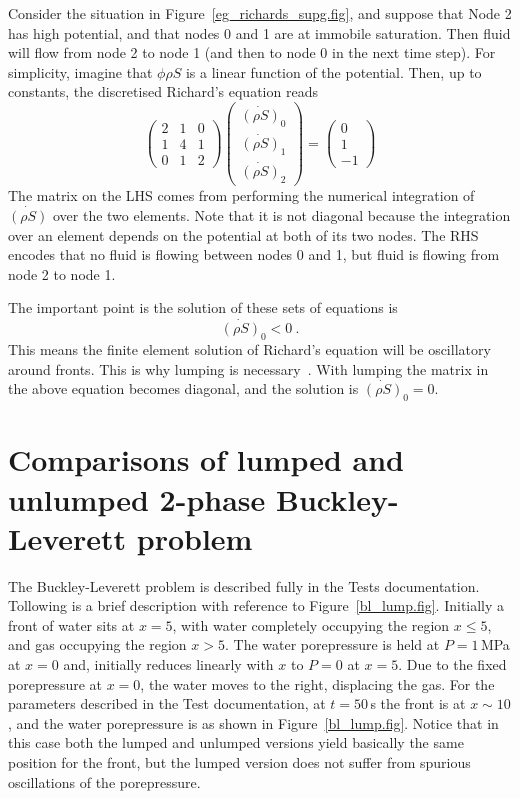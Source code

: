 \documentclass[]{scrreprt}
\begin{document}
Consider the situation in Figure~\ref{eg_richards_supg.fig}, and
suppose that Node 2 has high potential, and that nodes 0 and 1 are at
immobile saturation.  Then fluid will flow from node 2 to node 1 (and
then to node 0 in the next time step).  For simplicity, imagine that
$\phi\rho S$ is a linear
function of the potential.  Then, up to constants, the
discretised Richard's equation reads
\begin{equation}
\left(
\begin{array}{ccc}
2 & 1 & 0 \\
1 & 4 & 1 \\
0 & 1 & 2
\end{array}
\right)
\left(
\begin{array}{c}
\dot{(\rho S)}_{0} \\
\dot{(\rho S)}_{1} \\
\dot{(\rho S)}_{2}
\end{array}
\right)
=
\left(
\begin{array}{c}
0 \\
1 \\
-1
\end{array}
\right)
\end{equation}
The matrix on the LHS comes from performing the numerical integration
of $\dot{(\rho S)}$ over the two elements.  Note that it is not diagonal
because the integration over an element depends on the potential at
both of its two nodes.  The RHS encodes that no fluid is flowing
between nodes 0 and 1, but fluid is flowing from node 2 to node 1.

The important point is the solution of these sets of equations is
\begin{equation}
\dot{(\rho S)}_{0} < 0 \ .
\end{equation}
This means the finite element solution of Richard's equation will be
oscillatory around fronts.  This is why lumping is
necessary~\cite{celiaET1990}.  With lumping the matrix in the above
equation becomes diagonal, and the solution is $\dot{(\rho S)}_{0} =
0$.

\section{Comparisons of lumped and unlumped 2-phase Buckley-Leverett problem}

The Buckley-Leverett problem is described fully in the Tests
documentation.  Tollowing is a brief description with reference to
Figure~\ref{bl_lump.fig}.  Initially a front of water sits at $x=5$,
with water completely occupying the region $x\leq 5$, and gas
occupying the region $x>5$.  The water porepressure is held at
$P=1$\,MPa at $x=0$ and, initially reduces linearly with $x$ to $P=0$
at $x=5$.  Due to the fixed porepressure at $x=0$, the water moves to
the right, displacing the gas.  For the parameters described in the
Test documentation, at $t=50$\,s the front is at $x\sim 10$, and the
water porepressure is as shown in Figure~\ref{bl_lump.fig}.  Notice
that in this case both the lumped and unlumped versions yield
basically the same position for the front, but the lumped version does
not suffer from spurious oscillations of the porepressure.
\end{document}
